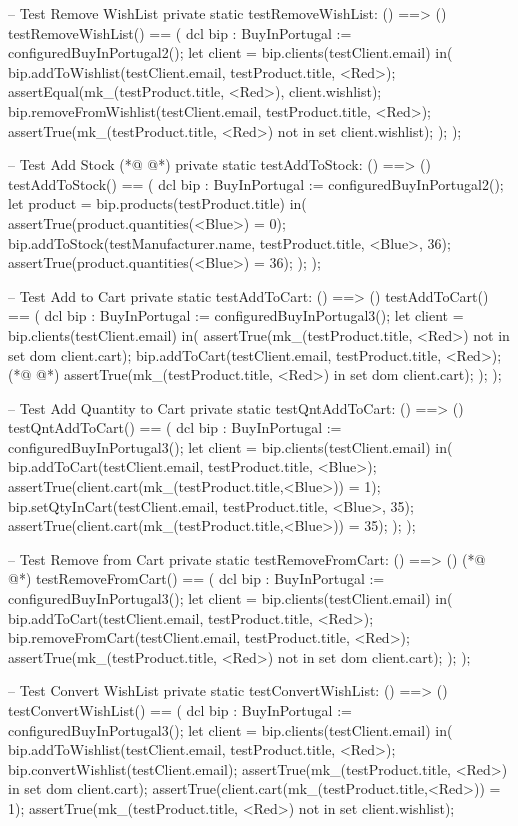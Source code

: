 \begin{vdmpp}[breaklines=true]
 -- Test Remove WishList
 private static testRemoveWishList: () ==> ()
 testRemoveWishList() == (
  dcl bip : BuyInPortugal := configuredBuyInPortugal2();
  let client = bip.clients(testClient.email)
  in(
   bip.addToWishlist(testClient.email, testProduct.title, <Red>);
   assertEqual({mk_(testProduct.title, <Red>)}, client.wishlist);
   bip.removeFromWishlist(testClient.email, testProduct.title, <Red>);
   assertTrue(mk_(testProduct.title, <Red>) not in set client.wishlist);
  );
 );
 
 -- Test Add Stock
(*@
\label{testQntAddToCart:266}
@*)
 private static testAddToStock: () ==> ()
 testAddToStock() == (
  dcl bip : BuyInPortugal := configuredBuyInPortugal2();
  let product = bip.products(testProduct.title)
  in(
   assertTrue(product.quantities(<Blue>) = 0);
   bip.addToStock(testManufacturer.name, testProduct.title, <Blue>, 36);
   assertTrue(product.quantities(<Blue>) = 36);
  );
 );
 
 -- Test Add to Cart
 private static testAddToCart: () ==> ()
 testAddToCart() == (
  dcl bip : BuyInPortugal := configuredBuyInPortugal3();
  let client = bip.clients(testClient.email)
  in(
   assertTrue(mk_(testProduct.title, <Red>)  not in set dom client.cart);
   bip.addToCart(testClient.email, testProduct.title, <Red>);
(*@
\label{testRemoveFromCart:285}
@*)
   assertTrue(mk_(testProduct.title, <Red>) in set dom client.cart);
  );
 );
 
 -- Test Add Quantity to Cart
 private static testQntAddToCart: () ==> ()
 testQntAddToCart() == (
  dcl bip : BuyInPortugal := configuredBuyInPortugal3();
  let client = bip.clients(testClient.email)
  in(
   bip.addToCart(testClient.email, testProduct.title, <Blue>);
   assertTrue(client.cart(mk_(testProduct.title,<Blue>)) = 1);
   bip.setQtyInCart(testClient.email, testProduct.title, <Blue>, 35);
   assertTrue(client.cart(mk_(testProduct.title,<Blue>)) = 35);
  );
 );
 
 -- Test Remove from Cart
 private static testRemoveFromCart: () ==> ()
(*@
\label{testConvertWishList:304}
@*)
 testRemoveFromCart() == (
  dcl bip : BuyInPortugal := configuredBuyInPortugal3();
  let client = bip.clients(testClient.email)
  in(
   bip.addToCart(testClient.email, testProduct.title, <Red>);
   bip.removeFromCart(testClient.email, testProduct.title, <Red>);
   assertTrue(mk_(testProduct.title, <Red>) not in set dom client.cart);
  );
 );
 
 -- Test Convert WishList
 private static testConvertWishList: () ==> ()
 testConvertWishList() == (
  dcl bip : BuyInPortugal := configuredBuyInPortugal3();
  let client = bip.clients(testClient.email)
  in(
   bip.addToWishlist(testClient.email, testProduct.title, <Red>);
    bip.convertWishlist(testClient.email);
    assertTrue(mk_(testProduct.title, <Red>) in set dom client.cart);
    assertTrue(client.cart(mk_(testProduct.title,<Red>)) = 1);
    assertTrue(mk_(testProduct.title, <Red>) not in set client.wishlist);
    

\end{vdmpp}

